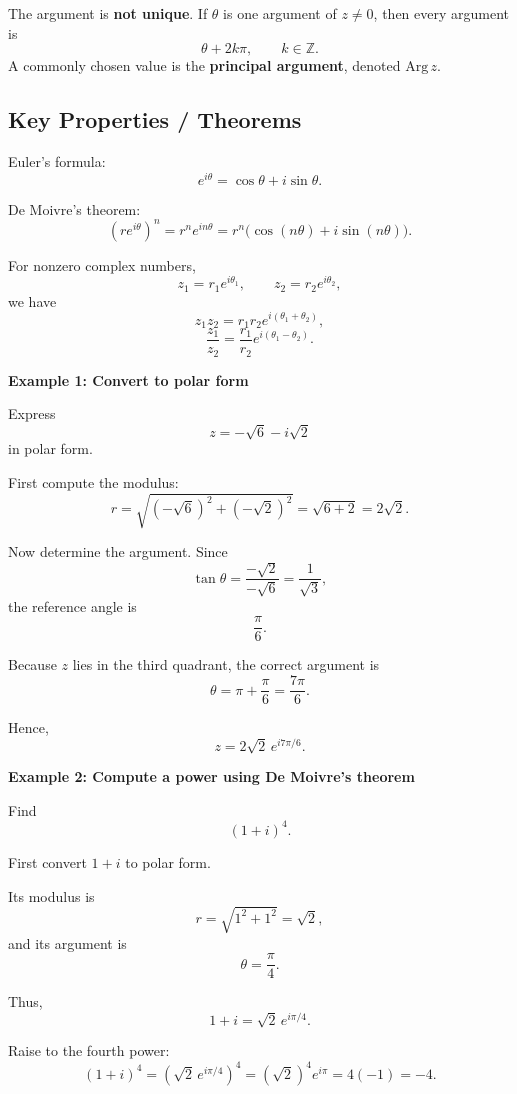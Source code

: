 \begin{conceptbox}
    The argument is \textbf{not unique}. If $\theta$ is one argument of $z\neq 0$, then every argument is
    \[
        \theta+2k\pi, \qquad k\in\mathbb{Z}.
    \]
    A commonly chosen value is the \textbf{principal argument}, denoted $\mathrm{Arg}\,z$.
\end{conceptbox}

\subsection*{Key Properties / Theorems}

\begin{conceptbox}
    Euler's formula:
    \[
        e^{i\theta}=\cos\theta+i\sin\theta.
    \]

    De Moivre's theorem:
    \[
        (re^{i\theta})^n = r^n e^{in\theta}
        = r^n\big(\cos(n\theta)+i\sin(n\theta)\big).
    \]
\end{conceptbox}

\begin{conceptbox}
    For nonzero complex numbers,
    \[
        z_1=r_1e^{i\theta_1}, \qquad z_2=r_2e^{i\theta_2},
    \]
    we have
    \[
        z_1z_2=r_1r_2e^{i(\theta_1+\theta_2)},
    \]
    \[
        \frac{z_1}{z_2}=\frac{r_1}{r_2}e^{i(\theta_1-\theta_2)}.
    \]
\end{conceptbox}

\begin{examplebox}
    \textbf{Example 1: Convert to polar form}

    Express
    \[
        z=-\sqrt{6}-i\sqrt{2}
    \]
    in polar form.

    First compute the modulus:
    \[
        r=\sqrt{(-\sqrt{6})^2+(-\sqrt{2})^2}
        =
        \sqrt{6+2}
        =
        2\sqrt{2}.
    \]

    Now determine the argument. Since
    \[
        \tan\theta=\frac{-\sqrt{2}}{-\sqrt{6}}=\frac{1}{\sqrt{3}},
    \]
    the reference angle is
    \[
        \frac{\pi}{6}.
    \]

    Because $z$ lies in the third quadrant, the correct argument is
    \[
        \theta=\pi+\frac{\pi}{6}=\frac{7\pi}{6}.
    \]

    Hence,
    \[
        z=2\sqrt{2}\,e^{i7\pi/6}.
    \]
\end{examplebox}

\begin{examplebox}
    \textbf{Example 2: Compute a power using De Moivre's theorem}

    Find
    \[
        (1+i)^4.
    \]

    First convert $1+i$ to polar form.

    Its modulus is
    \[
        r=\sqrt{1^2+1^2}=\sqrt{2},
    \]
    and its argument is
    \[
        \theta=\frac{\pi}{4}.
    \]

    Thus,
    \[
        1+i=\sqrt{2}\,e^{i\pi/4}.
    \]

    Raise to the fourth power:
    \[
        (1+i)^4 = \left(\sqrt{2}\,e^{i\pi/4}\right)^4
        = (\sqrt{2})^4 e^{i\pi}
        =4(-1)=-4.
    \]
\end{examplebox}

